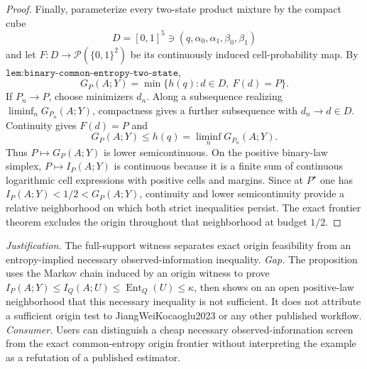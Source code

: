 \documentclass{article}
\begin{document}
\begin{proof}
Finally, parameterize every two-state product mixture by the compact cube
\[
 D=[0,1]^5\ni(q,\alpha_0,\alpha_1,\beta_0,\beta_1)
\]
and let \(F:D\to\mathcal P(\{0,1\}^2)\) be its continuously induced cell-probability map.  By \(\texttt{lem:binary-common-entropy-two-state}\),
\[
 G_P(A;Y)=\min\{h(q):d\in D,\ F(d)=P\}.
\]
If \(P_n\to P\), choose minimizers \(d_n\).  Along a subsequence realizing \(\liminf_nG_{P_n}(A;Y)\), compactness gives a further subsequence with \(d_n\to d\in D\).  Continuity gives \(F(d)=P\) and
\[
 G_P(A;Y)\leq h(q)=\liminf_nG_{P_n}(A;Y).
\]
Thus \(P\mapsto G_P(A;Y)\) is lower semicontinuous.  On the positive binary-law simplex, \(P\mapsto I_P(A;Y)\) is continuous because it is a finite sum of continuous logarithmic cell expressions with positive cells and margins.  Since at \(P^\star\) one has \(I_P(A;Y)<1/2<G_P(A;Y)\), continuity and lower semicontinuity provide a relative neighborhood on which both strict inequalities persist.  The exact frontier theorem excludes the origin throughout that neighborhood at budget \(1/2\).
\end{proof}
\par\smallskip\noindent \textit{Justification.} The full-support witness separates exact origin feasibility from an entropy-implied necessary observed-information inequality. \textit{Gap.} The proposition uses the Markov chain induced by an origin witness to prove \(I_P(A;Y)\leq I_Q(A;U)\leq\operatorname{Ent}_Q(U)\leq\kappa\), then shows on an open positive-law neighborhood that this necessary inequality is not sufficient. It does not attribute a sufficient origin test to JiangWeiKocaoglu2023 or any other published workflow. \textit{Consumer.} Users can distinguish a cheap necessary observed-information screen from the exact common-entropy origin frontier without interpreting the example as a refutation of a published estimator.
\end{document}
